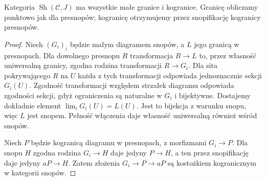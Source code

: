 \begin{twierdzenie}\label{cat:thm:sheaf-limits}
Kategoria $\operatorname{Sh}(\mathcal C,J)$ ma wszystkie małe granice i kogranice. Granicę obliczamy punktowo jak dla presnopów; kogranicę otrzymujemy przez snopifikację kogranicy presnopów.
\end{twierdzenie}
\begin{proof}
Niech $(G_i)_i$ będzie małym diagramem snopów, a $L$ jego granicą w presnopach. Dla dowolnego presnopu $R$ transformacja $R\to L$ to, przez własność uniwersalną granicy, zgodna rodzina transformacji $R\to G_i$. Dla sita pokrywającego $R$ na $U$ każda z tych transformacji odpowiada jednoznacznie sekcji $G_i(U)$. Zgodność transformacji względem strzałek diagramu odpowiada zgodności sekcji, gdyż ograniczenia są naturalne w $G_i$ i bijektywne. Dostajemy dokładnie element $\lim_i G_i(U)=L(U)$. Jest to bijekcja z warunku snopu, więc $L$ jest snopem. Pełność włączenia daje własność uniwersalną również wśród snopów.

Niech $P$ będzie kogranicą diagramu w presnopach, z morfizmami $G_i\to P$. Dla snopu $H$ zgodna rodzina $G_i\to H$ daje jedyny $P\to H$, a ten przez snopifikację daje jedyny $aP\to H$. Zatem złożenia $G_i\to P\to aP$ są kostożkiem kogranicznym w kategorii snopów.
\end{proof}

